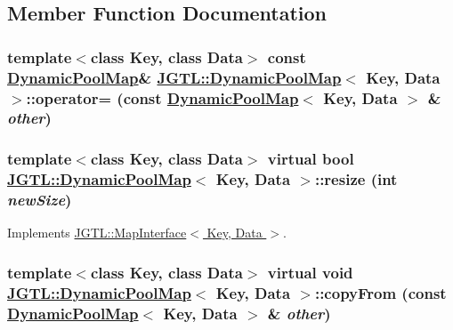 \subsection{Member Function Documentation}
\hypertarget{class_j_g_t_l_1_1_dynamic_pool_map_36d6be1323ed844a5d93ddf9814cc059}{
\subsubsection[operator=]{\setlength{\rightskip}{0pt plus 5cm}template$<$class Key, class Data$>$ const \hyperlink{class_j_g_t_l_1_1_dynamic_pool_map}{Dynamic\-Pool\-Map}\& \hyperlink{class_j_g_t_l_1_1_dynamic_pool_map}{JGTL::Dynamic\-Pool\-Map}$<$ Key, Data $>$::operator= (const \hyperlink{class_j_g_t_l_1_1_dynamic_pool_map}{Dynamic\-Pool\-Map}$<$ Key, Data $>$ \& {\em other})}}
\label{class_j_g_t_l_1_1_dynamic_pool_map_36d6be1323ed844a5d93ddf9814cc059}


\hypertarget{class_j_g_t_l_1_1_dynamic_pool_map_236509cad797d15cbed5e09adf356a04}{
\subsubsection[resize]{\setlength{\rightskip}{0pt plus 5cm}template$<$class Key, class Data$>$ virtual bool \hyperlink{class_j_g_t_l_1_1_dynamic_pool_map}{JGTL::Dynamic\-Pool\-Map}$<$ Key, Data $>$::resize (int {\em new\-Size})}}
\label{class_j_g_t_l_1_1_dynamic_pool_map_236509cad797d15cbed5e09adf356a04}




Implements \hyperlink{class_j_g_t_l_1_1_map_interface_177b75de36104c54e53080db65b777a2}{JGTL::Map\-Interface$<$ Key, Data $>$}.\hypertarget{class_j_g_t_l_1_1_dynamic_pool_map_bce0771b0a4cc6238e7e3e24f5ec3bf0}{
\subsubsection[copyFrom]{\setlength{\rightskip}{0pt plus 5cm}template$<$class Key, class Data$>$ virtual void \hyperlink{class_j_g_t_l_1_1_dynamic_pool_map}{JGTL::Dynamic\-Pool\-Map}$<$ Key, Data $>$::copy\-From (const \hyperlink{class_j_g_t_l_1_1_dynamic_pool_map}{Dynamic\-Pool\-Map}$<$ Key, Data $>$ \& {\em other})}}
\label{class_j_g_t_l_1_1_dynamic_pool_map_bce0771b0a4cc6238e7e3e24f5ec3bf0}


